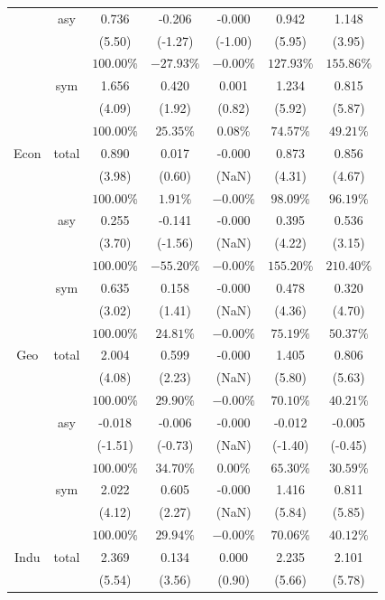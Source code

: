 \documentclass[
]{article}
\begin{document}
\begin{table}[H]
{\begin{tabular}{ccccccc}
   & asy & 0.736 & -0.206 & -0.000 & 0.942 & 1.148 \\ 
   &  & (5.50) & (-1.27) & (-1.00) & (5.95) & (3.95) \\ 
   &  & $100.00\%$ & $-27.93\%$ & $-0.00\%$ & $127.93\%$ & $155.86\%$ \\ 
   & sym & 1.656 & 0.420 & 0.001 & 1.234 & 0.815 \\ 
   &  & (4.09) & (1.92) & (0.82) & (5.92) & (5.87) \\ 
   &  & $100.00\%$ & $25.35\%$ & $0.08\%$ & $74.57\%$ & $49.21\%$ \\ 
   \hline 
Econ & total & 0.890 & 0.017 & -0.000 & 0.873 & 0.856 \\ 
   &  & (3.98) & (0.60) & (NaN) & (4.31) & (4.67) \\ 
   &  & $100.00\%$ & $1.91\%$ & $-0.00\%$ & $98.09\%$ & $96.19\%$ \\ 
   & asy & 0.255 & -0.141 & -0.000 & 0.395 & 0.536 \\ 
   &  & (3.70) & (-1.56) & (NaN) & (4.22) & (3.15) \\ 
   &  & $100.00\%$ & $-55.20\%$ & $-0.00\%$ & $155.20\%$ & $210.40\%$ \\ 
   & sym & 0.635 & 0.158 & -0.000 & 0.478 & 0.320 \\ 
   &  & (3.02) & (1.41) & (NaN) & (4.36) & (4.70) \\ 
   &  & $100.00\%$ & $24.81\%$ & $-0.00\%$ & $75.19\%$ & $50.37\%$ \\ 
   \hline 
Geo & total & 2.004 & 0.599 & -0.000 & 1.405 & 0.806 \\ 
   &  & (4.08) & (2.23) & (NaN) & (5.80) & (5.63) \\ 
   &  & $100.00\%$ & $29.90\%$ & $-0.00\%$ & $70.10\%$ & $40.21\%$ \\ 
   & asy & -0.018 & -0.006 & -0.000 & -0.012 & -0.005 \\ 
   &  & (-1.51) & (-0.73) & (NaN) & (-1.40) & (-0.45) \\ 
   &  & $100.00\%$ & $34.70\%$ & $0.00\%$ & $65.30\%$ & $30.59\%$ \\ 
   & sym & 2.022 & 0.605 & -0.000 & 1.416 & 0.811 \\ 
   &  & (4.12) & (2.27) & (NaN) & (5.84) & (5.85) \\ 
   &  & $100.00\%$ & $29.94\%$ & $-0.00\%$ & $70.06\%$ & $40.12\%$ \\ 
   \hline 
Indu & total & 2.369 & 0.134 & 0.000 & 2.235 & 2.101 \\ 
   &  & (5.54) & (3.56) & (0.90) & (5.66) & (5.78) \\ 

\end{tabular}}
\end{table}
\end{document}
